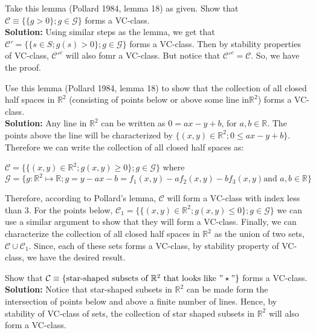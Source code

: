 \documentclass[11pt,letterpaper]{article}                  %
\begin{document}
\bigskip
\begin{problem} Take this lemma (Pollard 1984, lemma 18) as given. Show that $\mathcal{C}\equiv \{\{g>0\}; g\in \mathcal{G}\}$ forms a VC-class.\\

\textbf{Solution:} Using similar steps as the lemma, we get that $\mathcal{C}' = \{\{s\in S; g(s)>0\}; g \in \mathcal{G}\}$ forms a VC-class. Then by stability properties of VC-class, $\mathcal{C}'^{c}$ will also fomr a VC-class. But notice that $\mathcal{C}'^{c} = \mathcal{C}$. So, we have the proof. 
\end{problem}

\bigskip
\begin{problem} Use this lemma (Pollard 1984, lemma 18) to show that the collection of all closed half spaces in $\mathbb{R}^2$ (consisting of points below or above some line in$\mathbb{R}^2$) forms a VC-class.\\

\textbf{Solution:} Any line in $\mathbb{R}^2$ can be written as $0=ax-y+b$, for $a,b \in \mathbb{R}$. The points above the line will be characterized by $\{(x,y)\in \mathbb{R}^2; 0\leq ax-y+b\}$. Therefore we can write the collection of all closed half spaces as:
\begin{center}
$\mathcal{C}=\{\{(x,y)\in \mathbb{R}^2; g(x,y)\geq 0\}; g \in \mathcal{G}\}$ where \\
$\mathcal{G}=\{g:\mathbb{R}^2\mapsto \mathbb{R}; g= y-ax-b = f_1(x,y) - a f_2(x,y) - bf_3(x,y) \text{and } a,b \in \mathbb{R}\}$
\end{center}
Therefore, according to Pollard's lemma, $\mathcal{C}$ will form a VC-class with index less than 3. For the points below, $\mathcal{C}_1=\{\{(x,y)\in \mathbb{R}^2; g(x,y)\leq 0\}; g \in \mathcal{G}\}$ we can use a similar argument to show that they will form a VC-class. Finally, we can characterize the collection of all closed half spaces in $\mathbb{R}^2$ as the union of two sets, $\mathcal{C} \cup \mathcal{C}_1$. Since, each of these sets forms a VC-class, by stability property of VC-class, we have the desired result. 
\end{problem}

\bigskip
\begin{problem} Show that $\mathcal{C}\equiv \{\text{star-shaped subsets of } \mathbb{R}^2 \ \text{that looks like } "\star" \}$ forms a VC-class.\\

\textbf{Solution:} Notice that star-shaped subsets in $\mathbb{R}^2$ can be made form the intersection of points below and above a finite number of lines. Hence, by stability of VC-class of sets, the collection of star shaped subsets in $\mathbb{R}^2$ will also form a VC-class.
\end{problem}
\end{document}
